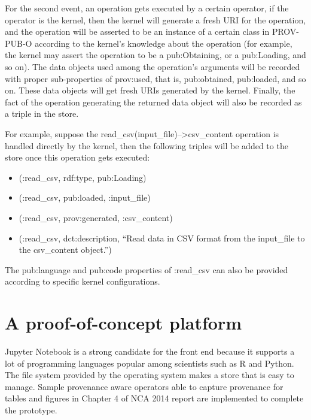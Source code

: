 For the second event, an operation gets executed by a certain operator, if the operator is the kernel, then the kernel will generate a fresh URI for the operation, and the operation will be asserted to be an instance of a certain class in PROV-PUB-O according to the kernel's knowledge about the operation (for example, the kernel may assert the operation to be a pub:Obtaining, or a pub:Loading, and so on). The data objects used among the operation's arguments will be recorded with proper sub-properties of prov:used, that is, pub:obtained, pub:loaded, and so on. These data objects will get fresh URIs generated by the kernel. Finally, the fact of the operation generating the returned data object will also be recorded as a triple in the store.

For example, suppose the read\_csv(input\_file)-->csv\_content operation is handled directly by the kernel, then the following triples will be added to the store once this operation gets executed:
\begin{itemize}
	\item (:read\_csv, rdf:type, pub:Loading)
	\item (:read\_csv, pub:loaded, :input\_file)
	\item (:read\_csv, prov:generated, :csv\_content)
	\item (:read\_csv, dct:description, ``Read data in CSV format from the input\_file to the csv\_content object.'')
\end{itemize}
The pub:language and pub:code properties of :read\_csv can also be provided according to specific kernel configurations.






\section{A proof-of-concept platform}
Jupyter Notebook is a strong candidate for the front end because it supports a lot of programming languages popular among scientists such as R and Python.
The file system provided by the operating system makes a store that is easy to manage.
Sample provenance aware operators able to capture provenance for tables and figures in Chapter 4 of NCA 2014 report are implemented to complete the prototype.

